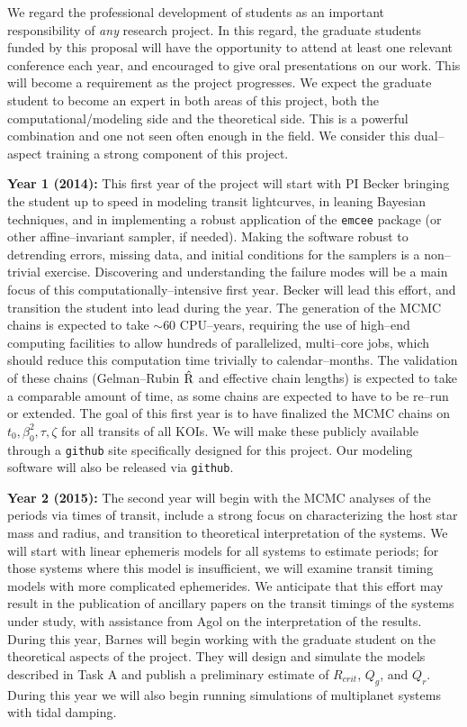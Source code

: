We regard the professional development of students as an important
responsibility of {\it any} research project.  In this regard, the
graduate students funded by this proposal will have the opportunity to
attend at least one relevant conference each year, and encouraged to
give oral presentations on our work.  This will become a requirement
as the project progresses.  We expect the graduate student to become
an expert in both areas of this project, both the
computational/modeling side and the theoretical side.  This is a
powerful combination and one not seen often enough in the field.  We
consider this dual--aspect training a strong component of this
project.

{\bf Year 1 (2014):} This first year of the project will start with PI
Becker bringing the student up to speed in modeling transit
lightcurves, in leaning Bayesian techniques, and in implementing a
robust application of the {\tt emcee} package (or other
affine--invariant sampler, if needed).  Making the software robust to
detrending errors, missing data, and initial conditions for the
samplers is a non--trivial exercise.  Discovering and understanding
the failure modes will be a main focus of this
computationally--intensive first year.  Becker will lead this effort,
and transition the student into lead during the year.  The generation
of the MCMC chains is expected to take $\sim 60$ CPU--years, requiring
the use of high--end computing facilities to allow hundreds of
parallelized, multi--core jobs, which should reduce this computation
time trivially to calendar--months. The validation of these chains
(Gelman--Rubin $\hat{\rm R}$ and effective chain lengths) is expected
to take a comparable amount of time, as some chains are expected to
have to be re--run or extended.  The goal of this first year is to
have finalized the MCMC chains on $t_0, \beta_0^2, \tau, \zeta$ for
all transits of all KOIs.  We will make these publicly available
through a {\tt github} site specifically designed for this project.
Our modeling software will also be released via {\tt github}.

{\bf Year 2 (2015):} The second year will begin with the MCMC analyses
of the periods via times of transit, include a strong focus on
characterizing the host star mass and radius, and transition to
theoretical interpretation of the systems.  We will start with linear
ephemeris models for all systems to estimate periods; for those
systems where this model is insufficient, we will examine transit
timing models with more complicated ephemerides.  We anticipate that
this effort may result in the publication of ancillary papers on the
transit timings of the systems under study, with assistance from Agol
on the interpretation of the results. During this year, Barnes will
begin working with the graduate student on the theoretical aspects of
the project. They will design and simulate the models described in
Task A and publish a preliminary estimate of $R_{crit}$, $Q_g$, and
$Q_r$. During this year we will also begin running simulations of
multiplanet systems with tidal damping.

